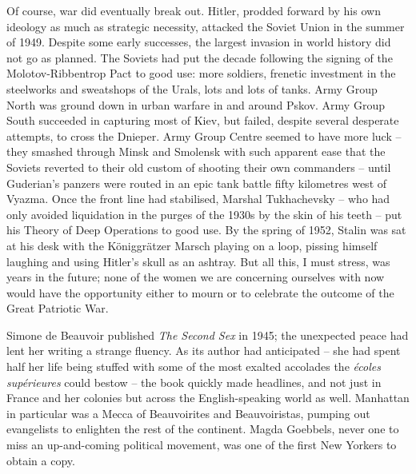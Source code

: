 \divsep

Of course, war did eventually break out. Hitler, prodded forward by his own ideology as much as strategic necessity, attacked the Soviet Union in the summer of 1949. Despite some early successes, the largest invasion in world history did not go as planned. The Soviets had put the decade following the signing of the Molotov-Ribbentrop Pact to good use: more soldiers, frenetic investment in the steelworks and sweatshops of the Urals, lots and lots of tanks. Army Group North was ground down in urban warfare in and around Pskov. Army Group South succeeded in capturing most of Kiev, but failed, despite several desperate attempts, to cross the Dnieper. Army Group Centre seemed to have more luck -- they smashed through Minsk and Smolensk with such apparent ease that the Soviets reverted to their old custom of shooting their own commanders -- until Guderian's panzers were routed in an epic tank battle fifty kilometres west of Vyazma. Once the front line had stabilised, Marshal Tukhachevsky -- who had only avoided liquidation in the purges of the 1930s by the skin of his teeth -- put his Theory of Deep Operations to good use. By the spring of 1952, Stalin was sat at his desk with the Königgrätzer Marsch playing on a loop, pissing himself laughing and using Hitler's skull as an ashtray. But all this, I must stress, was years in the future; none of the women we are concerning ourselves with now would have the opportunity either to mourn or to celebrate the outcome of the Great Patriotic War.

Simone de Beauvoir published \textit{The Second Sex} in 1945; the unexpected peace had lent her writing a strange fluency. As its author had anticipated -- she had spent half her life being stuffed with some of the most exalted accolades the \textit{\'ecoles sup\'erieures} could bestow -- the book quickly made headlines, and not just in France and her colonies but across the English-speaking world as well. Manhattan in particular was a Mecca of Beauvoirites and Beauvoiristas, pumping out evangelists to enlighten the rest of the continent. Magda Goebbels, never one to miss an up-and-coming political movement, was one of the first New Yorkers to obtain a copy.

